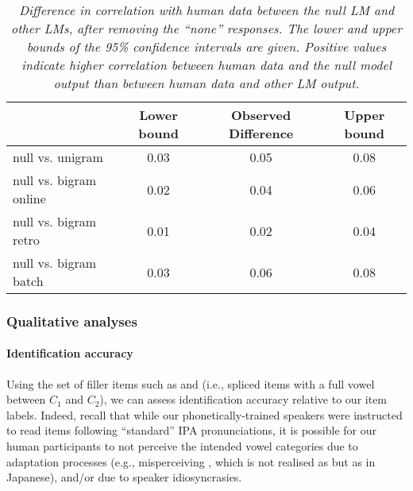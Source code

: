 {%
\begin{table}[htb!]
\centering
\caption{\textit{Difference in correlation with human data between the null LM and other LMs, after removing the ``none'' responses. The lower and upper bounds of the 95\% confidence intervals are given. Positive values indicate higher correlation between human data and the null model output than between human data and other LM output.}}
\label{tab:m-ahpa-cor_diff-nonone}
\vspace{0.25cm}
\begin{tabular}{lccc}
   \toprule
  & Lower bound & Observed Difference & Upper bound \\  \midrule
  null vs. unigram & 0.03 & 0.05 & 0.08  \\  
  null vs. bigram online & 0.02 & 0.04 & 0.06  \\   
  null vs. bigram retro & 0.01 & 0.02 & 0.04   \\ 
  null vs. bigram batch & 0.03 & 0.06 & 0.08   \\ \bottomrule 
\end{tabular}
\end{table}

\subsubsection{Qualitative analyses}

\paragraph{Identification accuracy}
Using the set of filler items such as  and  (i.e., spliced items with a full vowel between $C_1$ and $C_2$), we can assess identification accuracy relative to our item labels. Indeed, recall that while our phonetically-trained speakers were instructed to read items following ``standard'' IPA pronunciations, it is possible for our human participants to not perceive the intended vowel categories due to adaptation processes (e.g., misperceiving , which is not realised as \textipa{[u]} but as \textipa{[W]} in Japanese), and/or due to speaker idiosyncrasies.

}
